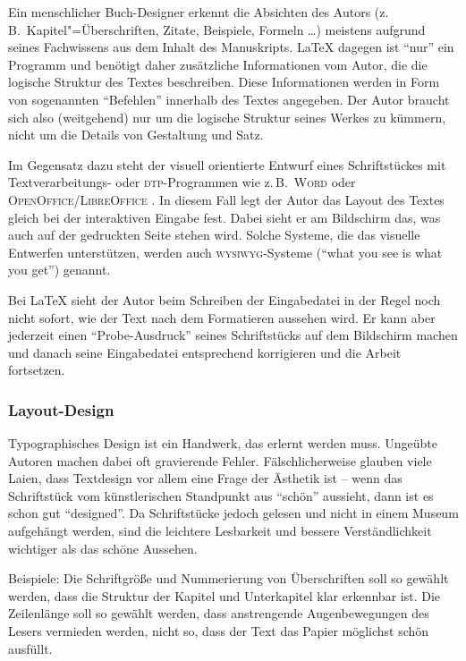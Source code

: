 Ein menschlicher Buch-Designer erkennt die Absichten des Autors
(z.\,B.\ Kapitel"=Überschriften, Zitate, Beispiele, Formeln
\dots) meistens aufgrund seines Fachwissens aus dem Inhalt des
Manuskripts.  \LaTeX{} dagegen ist \enquote{nur} ein Programm und
benötigt daher zusätzliche Informationen vom Autor, die die
logische Struktur des Textes beschreiben.
Diese Informationen werden in Form von sogenannten \enquote{Befehlen}
innerhalb des Textes angegeben.
Der Autor braucht sich also
(weitgehend) nur um die logische Struktur seines Werkes zu kümmern,
nicht um die Details von Gestaltung und Satz.
 
Im Gegensatz dazu steht der visuell orientierte Entwurf eines
Schriftstückes mit Textverarbeitungs- oder \textsc{dtp}-Programmen wie z.\,B.\ 
\textsc{Word} oder \textsc{OpenOffice/LibreOffice} .
In diesem Fall legt der Autor das Layout des Textes gleich bei der
interaktiven Eingabe fest. Dabei sieht er am Bildschirm das, was
auch auf der gedruckten Seite stehen wird. Solche Systeme, die das
visuelle Entwerfen unterstützen, werden auch \textsc{wysiwyg}-Systeme
(\enquote{what you see is what you get}) genannt.
 
Bei \LaTeX{} sieht der Autor beim Schreiben der Eingabedatei in
der Regel noch nicht sofort, wie der Text nach dem Formatieren 
aussehen wird. Er kann aber %
jederzeit einen \enquote{Probe-Ausdruck} seines Schriftstücks auf dem
Bildschirm machen und danach seine Eingabedatei entsprechend 
korrigieren und die Arbeit fortsetzen.
 
 
\subsubsection{Layout-Design}
 
Typographisches Design ist ein Handwerk, das erlernt werden muss.
Ungeübte Autoren machen dabei oft gravierende Fehler.
Fälschlicherweise glauben viele Laien, dass Textdesign
vor allem eine Frage der Ästhetik ist -- wenn das
Schriftstück vom künstlerischen Standpunkt aus \enquote{schön}
aussieht, dann ist es schon gut \enquote{designed}.
Da Schriftstücke jedoch gelesen und nicht in einem Museum
aufgehängt werden, sind die leichtere Lesbarkeit und bessere
Verständlichkeit wichtiger als das schöne Aussehen.
 
Beispiele:
Die Schriftgröße und Nummerierung von Überschriften soll so
gewählt werden, dass die Struktur der Kapitel und Unterkapitel
klar erkennbar ist.
Die Zeilenlänge soll so gewählt werden, dass anstrengende
Augenbewegungen des Lesers vermieden werden, nicht so, dass der
Text das Papier möglichst schön ausfüllt.
 

